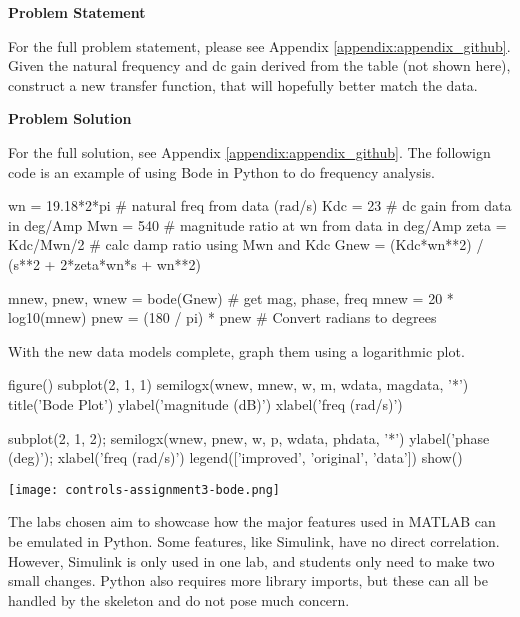 \begin{tcolorbox}[breakable, enhanced jigsaw, title=ME 570: Assignment \ref{control_assignment_3}, 
    colframe=ksu-purple, colback=ksu-gray]

    \textbf{Problem Statement}
    \parindent15pt

    For the full problem statement, please see Appendix \ref{appendix:appendix_github}. Given the 
    natural frequency and dc gain derived from the table (not shown here), construct a new transfer 
    function, that will hopefully better match the data.
    
    \tcblower
    \textbf{Problem Solution}
    \parindent15pt

    For the full solution, see Appendix \ref{appendix:appendix_github}. The followign code is an
    example of using Bode in Python to do frequency analysis.

\begin{python}
wn = 19.18*2*pi # natural freq from data (rad/s)
Kdc = 23 # dc gain from data in deg/Amp
Mwn = 540 # magnitude ratio at wn from data in deg/Amp
zeta = Kdc/Mwn/2 # calc damp ratio using Mwn and Kdc
Gnew = (Kdc*wn**2) / (s**2 + 2*zeta*wn*s + wn**2)

mnew, pnew, wnew = bode(Gnew) # get mag, phase, freq
mnew = 20 * log10(mnew)
pnew = (180 / pi) * pnew # Convert radians to degrees
\end{python}

With the new data models complete, graph them using a logarithmic plot.

\begin{python}
figure()
subplot(2, 1, 1)
semilogx(wnew, mnew, w, m, wdata, magdata, '*')
title('Bode Plot')
ylabel('magnitude (dB)')
xlabel('freq (rad/s)')

subplot(2, 1, 2); 
semilogx(wnew, pnew, w, p, wdata, phdata, '*')
ylabel('phase (deg)');
xlabel('freq (rad/s)')
legend(['improved', 'original', 'data'])
show()
\end{python}

\begin{center}
    \texttt{[image: controls-assignment3-bode.png]}
\end{center}
\end{tcolorbox}

The labs chosen aim to showcase how the major features used in MATLAB can be emulated in Python. Some features, like Simulink, have
no direct correlation. However, Simulink is only used in one lab, and students only need to make two small changes. Python also
requires more library imports, but these can all be handled by the skeleton and do not pose much concern.

